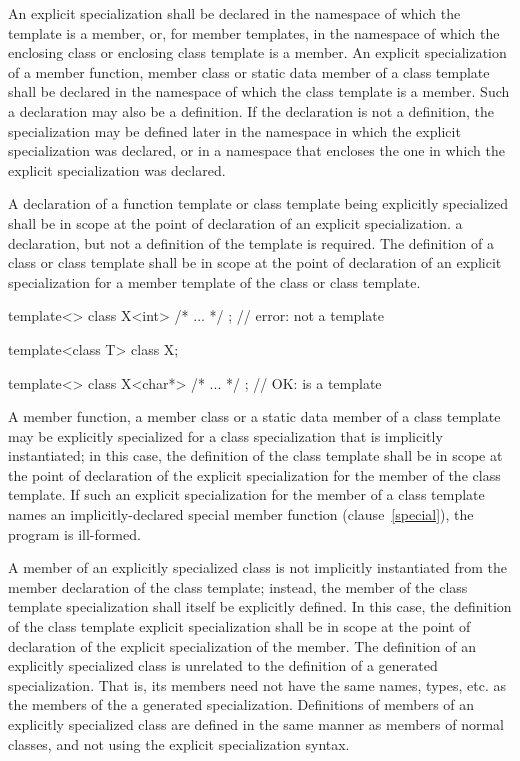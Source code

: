 \pnum
An explicit specialization shall be declared in the namespace of which the
template is a member, or, for member templates, in the namespace of which
the enclosing class or enclosing class template is a member.
An explicit specialization of a member function, member class or static
data member of a class template shall be declared in the namespace of which
the class template is a member. Such a declaration may also be a definition.
If the declaration is not a definition, the specialization may be defined
later in the namespace in which the explicit specialization was declared,
or in a namespace that encloses the one in which the explicit specialization
was declared.

\pnum
A declaration of a function template or class template being explicitly
specialized shall be in scope at the point of declaration of an explicit
specialization.
\enternote
a declaration, but not a definition of the template is required.
\exitnote
The definition of a class or class template shall be in scope at the point of
declaration of an explicit specialization for a member template of the class
or class template.
\enterexample

\begin{codeblock}
template<> class X<int> { /* ... */ };          // error:  not a template

template<class T> class X;

template<> class X<char*> { /* ... */ };        // OK:  is a template
\end{codeblock}
\exitexampleb

\pnum
A member function, a member class or a static data member of a class template
may be explicitly specialized for a class specialization that is implicitly
instantiated;
in this case, the definition of the class template shall be in scope at the
point of declaration of the explicit specialization for the member of the class
template.
If such an explicit specialization for the member of a class template names an
implicitly-declared special member function (clause~\ref{special}),
the program is ill-formed.

\pnum
A member of an explicitly specialized class is not implicitly
instantiated from the member declaration of the class template;
instead, the member of the class template specialization shall itself be
explicitly defined.
In this case, the definition of the class template explicit specialization
shall be in scope at the point of declaration of the explicit specialization
of the member.
The definition of an explicitly specialized class is unrelated to the
definition of a generated specialization.
That is, its members need
not have the same names, types, etc. as the members of the a generated
specialization.
Definitions of members of an explicitly specialized
class are defined in the same manner as members of normal classes, and
not using the explicit specialization syntax.
\enterexample

